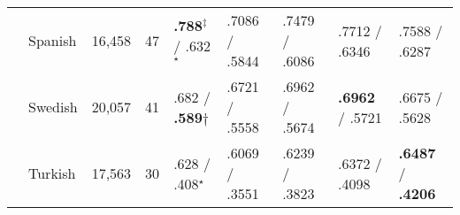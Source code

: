 \begin{table}[ht]
\begin{flushleft}
\begin{tabular}{|@{ }l@{ }|@{ }l@{ }|@{ }l@{ }|@{ }l@{ }|@{ }l@{ }|@{ }l@{ }|@{ }l@{ }|@{ }l@{ }|@{ }l@{ }|}
        & Spanish    & 16,458  & 47   & {\bf.788}$^\ddagger$ / .632$^\star$          & .7086 / .5844 & .7479 / .6086  & .7712 / .6346     & .7588 / .6287 \\
        & Swedish    & 20,057  & 41   & .682 / {\bf.589}$\dagger$        & .6721 / .5558 & .6962 / .5674  & {\bf.6962} / .5721     & .6675 / .5628 \\
        & Turkish    & 17,563  & 30   & .628 / .408$^\star$        & .6069 / .3551 & .6239 / .3823  & .6372 / .4098 & {\bf.6487} / {\bf.4206} \\ \hline %
    \end{tabular}
  \end{flushleft}
  \label{tab:multiresults}
\end{table}
